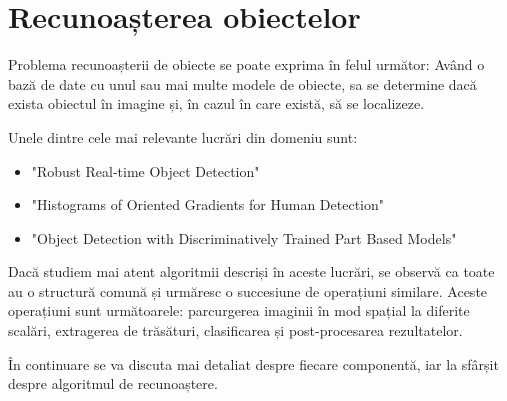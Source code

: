 \chapter{Recunoașterea obiectelor}




Problema recunoașterii de obiecte se poate exprima în felul următor:
Având o bază de date cu unul sau mai multe modele de obiecte, sa se determine dacă exista obiectul în imagine și, în cazul în care există, să se localizeze.

Unele dintre cele mai relevante lucrări din domeniu sunt: 
\begin{itemize}
	\item "Robust Real-time Object Detection" \cite{Viola01robustreal-time}
	\item "Histograms of Oriented Gradients for Human Detection" \cite{Dalal05histogramsof}
	\item "Object Detection with Discriminatively Trained Part Based Models" \cite{Felzenszwalb_objectdetection}
\end{itemize}

Dacă studiem mai atent algoritmii descriși în aceste lucrări, se observă ca toate au o structură comună și urmăresc o succesiune de operațiuni similare.
Aceste operațiuni sunt următoarele: parcurgerea imaginii în mod spațial la diferite scalări, extragerea de trăsături, clasificarea și post-procesarea rezultatelor.

În continuare se va discuta mai detaliat despre fiecare componentă, iar la sfârșit despre algoritmul de recunoaștere.

